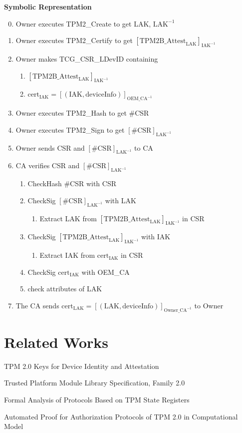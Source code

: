 \documentclass{article}
\begin{document}
\textbf{Symbolic Representation}
\begin{enumerate}
    \setcounter{enumi}{-1}
    \item Owner executes TPM2\_Create to get LAK, $\text{LAK}^{-1}$
    \item Owner executes TPM2\_Certify to get $[\text{TPM2B\_Attest}_\text{LAK}]_{\text{IAK}^{-1}}$
    \item Owner makes TCG\_CSR\_LDevID containing
    \begin{enumerate}
        \item $[\text{TPM2B\_Attest}_\text{LAK}]_{\text{IAK}^{-1}}$
        \item $\text{cert}_\text{IAK} = [(\text{IAK}, \text{deviceInfo})]_{\text{OEM\_CA}^{-1}}$
    \end{enumerate}
    \item Owner executes TPM2\_Hash to get $\text{\#CSR}$
    \item Owner executes TPM2\_Sign to get $[\text{\#CSR}]_{\text{LAK}^{-1}}$
    \item Owner sends CSR and $[\text{\#CSR}]_{\text{LAK}^{-1}}$ to CA
    \item CA verifies CSR and $[\text{\#CSR}]_{\text{LAK}^{-1}}$
    \begin{enumerate}
        \item CheckHash \#CSR with CSR
        \item CheckSig $[\text{\#CSR}]_{\text{LAK}^{-1}}$ with LAK
        \begin{enumerate}
          \item Extract LAK from $[\text{TPM2B\_Attest}_\text{LAK}]_{\text{IAK}^{-1}}$ in CSR
        \end{enumerate}
        \item CheckSig $[\text{TPM2B\_Attest}_\text{LAK}]_{\text{IAK}^{-1}}$ with IAK
        \begin{enumerate}
          \item Extract IAK from $\text{cert}_\text{IAK}$ in CSR
        \end{enumerate}
        \item CheckSig $\text{cert}_\text{IAK}$ with OEM\_CA
        \item check attributes of LAK
    \end{enumerate}
    \item The CA sends $\text{cert}_{\text{LAK}} = [(\text{LAK}, \text{deviceInfo})]_{\text{Owner\_CA}^{-1}}$ to Owner
\end{enumerate}

\section*{Related Works}
TPM 2.0 Keys for Device Identity and Attestation \cite{certSpec}

Trusted Platform Module Library Specification, Family 2.0 \cite{tpmSpec}

Formal Analysis of Protocols Based on TPM State Registers \cite{pcrModel}

Automated Proof for Authorization Protocols of TPM 2.0 in Computational Model \cite{authModel}


\printbibliography
\end{document}
